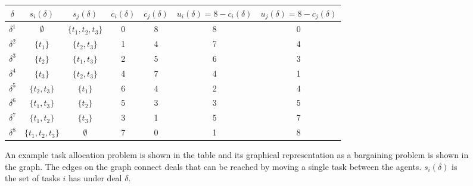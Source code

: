 \begin{SCfigure}
  \begin{minipage}{1.0\linewidth}
    \begin{center}
      \begin{tabular}{ccccccc} \toprule
        $\delta$ & $s_i(\delta)$ & $s_j(\delta)$ & $c_i(\delta)$ & $c_j(\delta)$ & $u_i(\delta) = 8 - c_i(\delta)$ & $u_j(\delta) = 8 - c_j(\delta)$ \\ \midrule
        $\delta^1$ & $\emptyset$ & $\{t_1,t_2,t_3\}$ & 0 & 8 & 8 & 0\\ 
        $\delta^2$ & $\{t_1\}$ & $\{t_2,t_3\}$       & 1 & 4 & 7 & 4\\
        $\delta^3$ & $\{t_2\}$ & $\{t_1,t_3\}$       & 2 & 5 & 6 & 3\\
        $\delta^4$ & $\{t_3\}$ & $\{t_2,t_3\}$       & 4 & 7 & 4 & 1\\
        $\delta^5$ & $\{t_2,t_3\}$ & $\{t_1\}$       & 6 & 4 & 2 & 4\\
        $\delta^6$ & $\{t_1,t_3\}$ & $\{t_2\}$       & 5 & 3 & 3 & 5\\
        $\delta^7$ & $\{t_1,t_2\}$ & $\{t_3\}$       & 3 & 1 & 5 & 7\\
        $\delta^8$ & $\{t_1,t_2,t_3\}$ & $\emptyset$ & 7 & 0 & 1 & 8\\
        \bottomrule
      \end{tabular}

      \bigskip

\end{center}
  \end{minipage}
  \caption{An example task allocation problem is shown in the table
    and its graphical representation as a bargaining problem is shown
    in the graph. The edges on the graph connect deals that can be
    reached by moving a single task between the agents. $s_i(\delta)$
    is the set of tasks $i$ has under deal $\delta$. }
  \label{fig:task-allocation}
\end{SCfigure}

